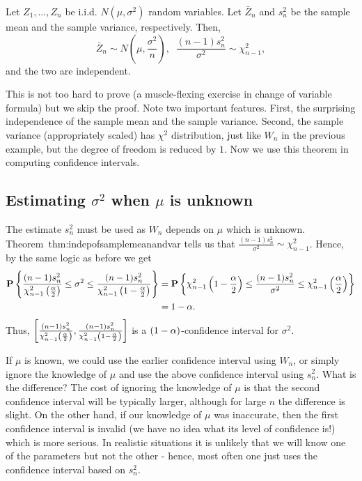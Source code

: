 \documentclass[preprint,  11pt]{amsart}
\def\sig{{\sigma}}
\begin{document}
\begin{theorem}\label{thm:indepofsamplemeanandvar} Let $Z_{1},\ldots ,Z_{n}$ be i.i.d. $N(\mu,\sig^{2})$ random variables. Let $\bar{Z}_{n}$ and $s_{n}^{2}$ be the sample mean and the sample variance, respectively. Then,
$$
\bar{Z}_{n}\sim N(\mu,\frac{\sig^{2}}{n}), \;\;  \frac{(n-1)s_{n}^{2}}{\sig^{2}}\sim \chi^{2}_{n-1},
$$
and the two are independent.
\end{theorem}
This is not too hard to prove (a muscle-flexing exercise in change of variable formula) but we skip the proof. Note two important features. First, the surprising independence of the sample mean and the sample variance. Second, the sample variance (appropriately scaled) has $\chi^{2}$ distribution, just like $W_{n}$ in the previous example, but the degree of freedom is reduced by $1$. Now we use this theorem in computing confidence intervals.


\subsection{Estimating $\sig^{2}$ when $\mu$ is unknown}
The estimate $s_{n}^{2}$ must be used as $W_{n}$ depends on $\mu$ which is unknown. Theorem~{thm:indepofsamplemeanandvar} tells us that $\frac{(n-1)s_{n}^{2}}{\sig^{2}}\sim \chi^{2}_{n-1}$. Hence, by the same logic as before we get
\begin{align*}
\P\l\{   \frac{(n-1)s_{n}^{2}}{\chi_{n-1}^{2}\l(\frac{\alp}{2}\r)} \le \sig^{2}\le \frac{(n-1)s_{n}^{2}}{\chi_{n-1}^{2}\l(1-\frac{\alp}{2}\r)}\r\}&=\P\l\{ \chi_{n-1}^{2}\l(1-\frac{\alp}{2}\r) \le \frac{(n-1)s_{n}^{2}}{\sig^{2}} \le \chi_{n-1}^{2}\l(\frac{\alp}{2}\r)\r\} \\
&=1-\alp.
\end{align*}
 Thus, $\left[\frac{(n-1)s_{n}^{2}}{\chi_{n-1}^{2}\left(\frac{\alpha}{2}\right)} ,\frac{(n-1)s_{n}^{2}}{\chi_{n-1}^{2}\left(1-\frac{\alpha}{2}\right)}\right]$ is a $(1-\alpha)$-confidence interval for $\sig^{2}$.

If $\mu$ is known, we could use the earlier confidence interval using $W_{n}$, or simply ignore the knowledge of $\mu$ and use the above confidence interval using $s_{n}^{2}$. What is the difference? The cost of ignoring the knowledge of $\mu$ is that the second confidence interval will be typically larger, although for large $n$ the difference is slight. On the other hand, if our knowledge of $\mu$ was inaccurate, then the first confidence interval is invalid (we have no idea what its level of confidence is!) which is more serious. In realistic situations it is unlikely that we will know one of the parameters but not the other - hence, most often one just uses the confidence interval based on $s_{n}^{2}$.
\end{document}
